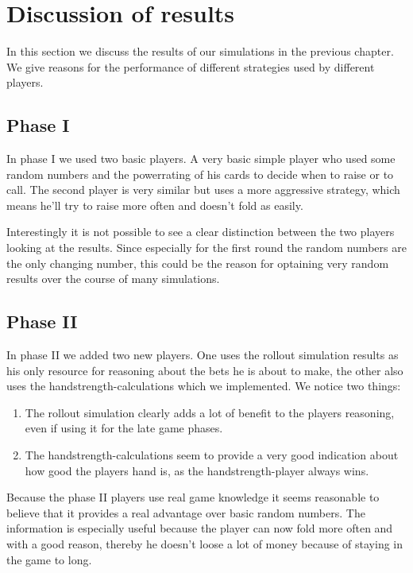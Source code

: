 \section{Discussion of results}
In this section we discuss the results of our simulations in the previous chapter. We give reasons for the performance
of different strategies used by different players.
\subsection{Phase I}
In phase I we used two basic players.
A very basic simple player who used some random numbers and the powerrating of his cards to decide when to raise or to
call. The second player is very similar but uses a more aggressive strategy, which means he'll try to raise more often
and doesn't fold as easily.

Interestingly it is not possible to see a
clear distinction between the two players looking at the results. Since especially for the first round the random
numbers are the only changing number, this could be the reason for optaining very  random results over the course of many
simulations.

\subsection{Phase II}
In phase II we added two new players. One uses the rollout simulation results as his only resource for reasoning about
the bets he is about to make, the other also uses the handstrength-calculations which we implemented. We notice two
things:
\begin{enumerate}
\item The rollout simulation clearly adds a lot of benefit to the players reasoning, even if using it for the late game
phases.
\item The handstrength-calculations seem to provide a very good indication about how good the players hand is, as the
handstrength-player always wins.
\end{enumerate}

Because the phase II players use real game knowledge it seems reasonable to believe that it provides a real advantage
over basic random numbers. The information is especially useful because the player can now fold more often and with a
good reason, thereby he doesn't loose a lot of money because of staying in the game to long.



